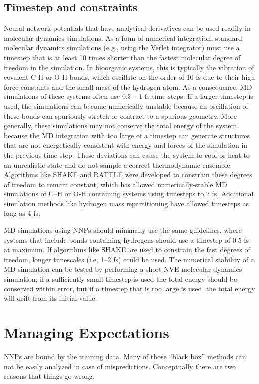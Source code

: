 \documentclass[9pt,bestpractices]{livecoms}
\begin{document}
\subsection{Timestep and constraints}
Neural network potentials that have analytical derivatives can be used readily
in molecular dynamics simulations. As a form of numerical integration, standard
molecular dynamics simulations (e.g., using the Verlet integrator) must use a
timestep that is at least 10 times shorter than the fastest molecular degree of
freedom in the simulation. In bioorganic systems, this is typically the
vibration of covalent C-H or O-H bonds, which oscillate on the order of 10 fs
due to their high force constants and the small mass of the hydrogen atom. As a
consequence, MD simulations of these systems often use 0.5 – 1 fs time steps. If
a larger timestep is used, the simulations can become numerically unstable
because an oscillation of these bonds can spuriously stretch or contract to a
spurious geometry. More generally, these simulations may not conserve the total
energy of the system because the MD integration with too large of a timestep can
generate structures that are not energetically consistent with energy and forces
of the simulation in the previous time step. These deviations can cause the
system to cool or heat to an unrealistic state and do not sample a correct
thermodynamic ensemble. Algorithms like SHAKE and RATTLE were developed to
constrain these degrees of freedom to remain constant, which has allowed
numerically-stable MD simulations of C–H or O-H containing systems using
timesteps to 2 fs. Additional simulation methods like hydrogen mass
repartitioning have allowed timesteps as long as 4 fs.
 
MD simulations using NNPs should minimally use the same guidelines, where
systems that include bonds containing hydrogens should use a timestep of 0.5 fs
at maximum. If algorithms like SHAKE  are used  to constrain the fast degrees of
freedom, longer timescales (i.e, 1–2 fs) could be used. The numerical stability
of a MD simulation can be tested by performing a short NVE molecular dynamics
simulation; if a sufficiently small timestep is used the total energy should be
conserved within error, but if a timestep that is too large is used, the total
energy will drift from its initial value.


\section{Managing Expectations}
NNPs are bound by the training data. Many of those “black box” methods can not
be easily analyzed in case of mispredictions. Conceptually there are two reasons
that things go wrong.
\end{document}
